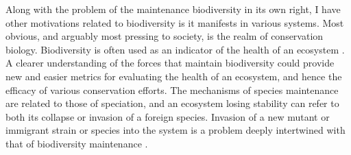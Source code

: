 Along with the problem of the maintenance biodiversity in its own right, I have other motivations related to biodiversity is it manifests in various systems. 
Most obvious, and arguably most pressing to society, is the realm of conservation biology. 
Biodiversity is often used as an indicator of the health of an ecosystem \cite{McKane2000,Pimm1988,Kalyuzhny2014,Peterson1997,Shaffer1981,Saavedra2013}. 
A clearer understanding of the forces that maintain biodiversity could provide new and easier metrics for evaluating the health of an ecosystem, and hence the efficacy of various conservation efforts.
The mechanisms of species maintenance are related to those of speciation, and an ecosystem losing stability can refer to both its collapse or invasion of a foreign species. 
Invasion of a new mutant or immigrant strain or species into the system is a problem deeply intertwined with that of biodiversity maintenance \cite{Hubbell2001}. 

